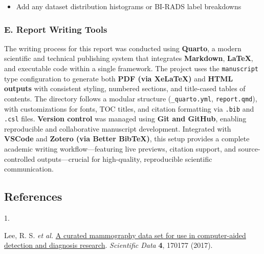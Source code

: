 \documentclass[
  12pt,
  letterpaper,
  DIV=11,
  numbers=noendperiod]{scrartcl}
\newlength{\cslhangindent}
\newlength{\csllabelwidth}
\newenvironment{CSLReferences}[2] %
 {\begin{list}{}{%
  \setlength{\itemindent}{0pt}
  \setlength{\leftmargin}{0pt}
  \setlength{\parsep}{0pt}
  \ifodd #1
   \setlength{\leftmargin}{\cslhangindent}
   \setlength{\itemindent}{-1\cslhangindent}
  \fi
  \setlength{\itemsep}{#2\baselineskip}}}
 {\end{list}}
\newcommand{\CSLLeftMargin}[1]{\parbox[t]{\csllabelwidth}{\strut#1\strut}}
\newcommand{\CSLRightInline}[1]{\parbox[t]{\linewidth - \csllabelwidth}{\strut#1\strut}}
\providecommand{\tightlist}{%
  \setlength{\itemsep}{0pt}\setlength{\parskip}{0pt}}
\begin{document}
\begin{itemize}
\tightlist
\item
  Add any dataset distribution histograms or BI-RADS label breakdowns
\end{itemize}

\subsubsection{E. Report Writing Tools}\label{e.-report-writing-tools}

The writing process for this report was conducted using \textbf{Quarto},
a modern scientific and technical publishing system that integrates
\textbf{Markdown}, \textbf{LaTeX}, and executable code within a single
framework. The project uses the \texttt{manuscript} type configuration
to generate both \textbf{PDF (via XeLaTeX)} and \textbf{HTML outputs}
with consistent styling, numbered sections, and title-cased tables of
contents. The directory follows a modular structure
(\texttt{\_quarto.yml}, \texttt{report.qmd}), with customizations for
fonts, TOC titles, and citation formatting via \texttt{.bib} and
\texttt{.csl} files. \textbf{Version control} was managed using
\textbf{Git and GitHub}, enabling reproducible and collaborative
manuscript development. Integrated with \textbf{VSCode} and
\textbf{Zotero (via Better BibTeX)}, this setup provides a complete
academic writing workflow---featuring live previews, citation support,
and source-controlled outputs---crucial for high-quality, reproducible
scientific communication.

\subsection*{References}\label{references-1}

\label{refs}
\begin{CSLReferences}{0}{0}
\CSLLeftMargin{1. }%
\CSLRightInline{Lee, R. S. \emph{et al.}
\href{https://doi.org/10.1038/sdata.2017.177}{A curated mammography data
set for use in computer-aided detection and diagnosis research}.
\emph{Scientific Data} \textbf{4}, 170177 (2017).}

\end{CSLReferences}
\end{document}
